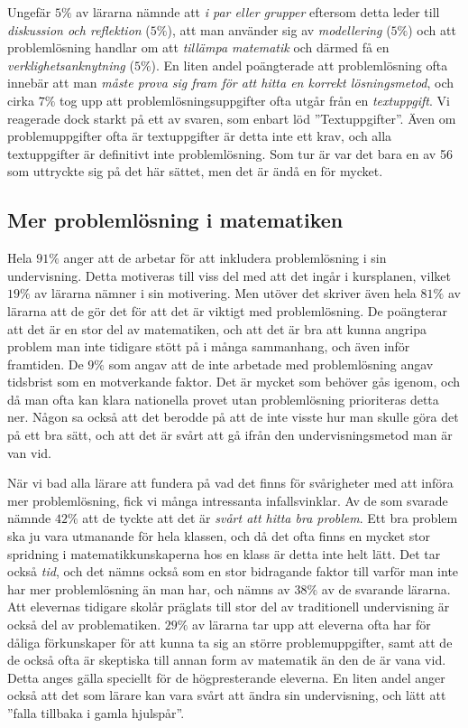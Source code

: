 \textcolor{lila}{Ungefär $5\%$ av lärarna nämnde att \textsl{i par eller grupper} eftersom detta leder till \textsl{diskussion och reflektion} ($5\%$), att man använder sig av \textsl{modellering} ($5\%$) och att problemlösning handlar om att \textsl{tillämpa matematik} och därmed få en \textsl{verklighetsanknytning} ($5\%$). En liten andel poängterade att problemlösning ofta innebär att man \textsl{måste prova sig fram för att hitta en korrekt lösningsmetod}, och cirka $7\%$ tog upp att problemlösningsuppgifter ofta utgår från en \textsl{textuppgift}. Vi reagerade dock starkt på ett av svaren, som enbart löd ''Textuppgifter''. Även om problemuppgifter ofta är textuppgifter är detta inte ett krav, och alla textuppgifter är definitivt inte problemlösning. Som tur är var det bara en av 56 som uttryckte sig på det här sättet, men det är ändå en för mycket.}

\subsection{Mer problemlösning i matematiken}
\label{sec:MerProblemlosning}

\textcolor{lila}{Hela $91\%$ anger att de arbetar för att inkludera problemlösning i sin undervisning. Detta motiveras till viss del med att det ingår i kursplanen, vilket $19\%$ av lärarna nämner i sin motivering. Men utöver det skriver även hela $81\%$ av lärarna att de gör det för att det är viktigt med problemlösning. De poängterar att det är en stor del av matematiken, och att det är bra att kunna angripa problem man inte tidigare stött på i många sammanhang, och även inför framtiden. De $9\%$ som angav att de inte arbetade med problemlösning angav tidsbrist som en motverkande faktor. Det är mycket som behöver gås igenom, och då man ofta kan klara nationella provet utan problemlösning prioriteras detta ner. Någon sa också att det berodde på att de inte visste hur man skulle göra det på ett bra sätt, och att det är svårt att gå ifrån den undervisningsmetod man är van vid.}

\textcolor{lila}{När vi bad alla lärare att fundera på vad det finns för svårigheter med att införa mer problemlösning, fick vi många intressanta infallsvinklar. Av de som svarade nämnde $42\%$ att de tyckte att det är \textsl{svårt att hitta bra problem}. Ett bra problem ska ju vara utmanande för hela klassen, och då det ofta finns en mycket stor spridning i matematikkunskaperna hos en klass är detta inte helt lätt. Det tar också \textsl{tid}, och det nämns också som en stor bidragande faktor till varför man inte har mer problemlösning än man har, och nämns av $38\%$ av de svarande lärarna. Att elevernas tidigare skolår präglats till stor del av traditionell undervisning är också del av problematiken. $29\%$ av lärarna tar upp att eleverna ofta har för dåliga förkunskaper för att kunna ta sig an större problemuppgifter, samt att de de också ofta är skeptiska till annan form av matematik än den de  är vana vid. Detta anges  gälla speciellt för de högpresterande eleverna. En liten andel anger också att det som lärare kan vara svårt att ändra sin undervisning, och lätt att ''falla tillbaka i gamla hjulspår''.}

